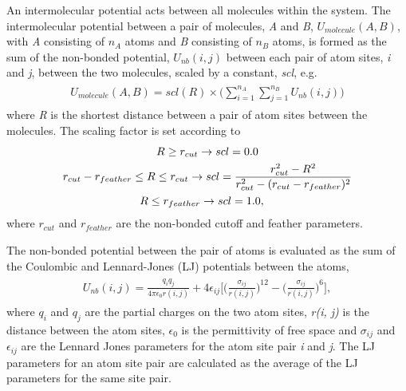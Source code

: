 \documentclass[letterpaper,10pt,english]{sphinxmanual}
\begin{document}
An intermolecular potential acts between all molecules within the system. The intermolecular potential between a pair of molecules, \emph{A} and \emph{B}, \(U_{molecule} (A, B)\), with \emph{A} consisting of \(n_A\) atoms and \emph{B} consisting of \(n_B\) atoms, is formed as the sum of the non-bonded potential, \(U_{nb} (i, j)\) between each pair of atom sites, \emph{i} and \emph{j}, between the two molecules, scaled by a constant, \emph{scl}, e.g.
\label{protoms:equation-intermol1}\begin{gather}
\begin{split}U_{molecule}(A,B) = scl(R)\times\biggl( \sum_{i=1}^{n_A} \sum_{j=1}^{n_B} U_{nb}(i,j) \biggr)\end{split}\label{protoms-intermol1}
\end{gather}
where \emph{R} is the shortest distance between a pair of atom sites between the molecules. The scaling factor is set according to
\begin{gather}
\begin{split}&R \ge r_{cut} \rightarrow scl = 0.0 \\\end{split}\notag\\\begin{split}&r_{cut}-r_{feather} \le R \le r_{cut} \rightarrow scl = \frac{r_{cut}^2-R^2}{r_{cut}^2-(r_{cut}-r_{feather})^2} \\\end{split}\notag\\\begin{split}&R \le r_{feather} \rightarrow scl = 1.0,\end{split}\notag
\end{gather}
where \(r_{cut}\) and \(r_{feather}\) are the non-bonded cutoff and feather parameters.

The non-bonded potential between the pair of atoms is evaluated as the sum of the Coulombic and Lennard-Jones (LJ) potentials between the atoms,
\label{protoms:equation-intermol2}\begin{gather}
\begin{split}U_{nb}(i,j) = \frac{q_i q_j}{4\pi\epsilon_{0} r(i,j)} + 4\epsilon_{ij}\biggl[ \biggl(\frac{\sigma_{ij}}{r(i,j)}\biggr)^{12} - \biggl(\frac{\sigma_{ij}}{r(i,j)}\biggr)^6 \biggr],\end{split}\label{protoms-intermol2}
\end{gather}
where \(q_i\) and \(q_j\) are the partial charges on the two atom sites, \emph{r(i, j)} is the distance between the atom sites, \(\epsilon_0\) is the permittivity of free space and \(\sigma_{ij}\) and \(\epsilon_{ij}\) are the Lennard Jones parameters for the atom site pair \emph{i} and \emph{j}. The LJ parameters for an atom site pair are calculated as the average of the LJ parameters for the same site pair.
\end{document}
